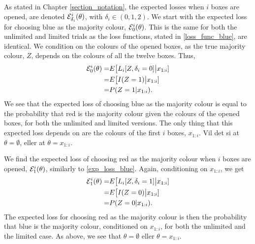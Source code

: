 As stated in Chapter \ref{section_notation}, the expected losses when $i$ boxes are opened, are denoted $\mathcal{E}_{\delta_i}^i(\theta)$, with $\delta_i \in (0,1,2)$.
We start with the expected loss for choosing blue as the majority colour, $\mathcal{E}^i_0(\theta)$. This is the same for both the unlimited and limited trials as the loss functions, stated in \eqref{loss_func_blue}, are identical. 
We condition on the colours of the opened boxes, as the true majority colour, $Z$, depends on the colours of all the twelve boxes. Thus,
\begin{equation}
\label{exp_loss_blue}
    \begin{aligned}
        \mathcal{E}^i_{0}(\theta) = &E\big[ L_i[Z,\delta_i=0] \big |x_{1:i} ]\\
        = & E \big[ I(Z=1) \big|x_{1:i}]\\
        = & P(Z=1|x_{1:i}).
    \end{aligned}
\end{equation}
We see that the expected loss of choosing blue as the majority colour is equal to the probability that red is the majority colour given the colours of the opened boxes, for both the unlimited and limited versions. The only thing that this expected loss depends on are the colours of the first $i$ boxes, $x_{1:i}$. Vil det si at $\theta = \emptyset$, eller at $\theta = x_{1:i}$.

We find the expected loss of choosing red as the majority colour when $i$ boxes are opened, $\mathcal{E}^i_{1}(\theta)$, similarly to \eqref{exp_loss_blue}. Again, conditioning on $x_{1:i}$, we get
\begin{equation}
\label{exp_loss_red}
    \begin{aligned}
        \mathcal{E}^i_{1}(\theta) 
        = &E\big[ L_i[Z,\delta_i=1] \big |x_{1:i} ]\\
        = & E \big[ I(Z=0) \big|x_{1:i}]\\
        = & P(Z=0|x_{1:i}).
    \end{aligned}
\end{equation}
The expected loss for choosing red as the majority colour is then the probability that blue is the majority colour, conditioned on $x_{1:i}$, for both the unlimited and the limited case. As above, we see that  $\theta=\emptyset$ eller $\theta = x_{1:i}$.

